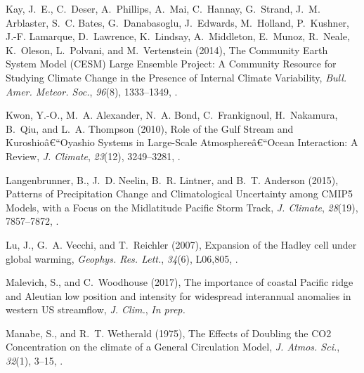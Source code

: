 \documentclass[final, double]{ua-thesis}
\begin{document}
\begin{thebibliography}{}
Kay, J.~E., C.~Deser, A.~Phillips, A.~Mai, C.~Hannay, G.~Strand, J.~M.
  Arblaster, S.~C. Bates, G.~Danabasoglu, J.~Edwards, M.~Holland, P.~Kushner,
  J.-F. Lamarque, D.~Lawrence, K.~Lindsay, A.~Middleton, E.~Munoz, R.~Neale,
  K.~Oleson, L.~Polvani, and M.~Vertenstein (2014), The {Community} {Earth}
  {System} {Model} ({CESM}) {Large} {Ensemble} {Project}: {A} {Community}
  {Resource} for {Studying} {Climate} {Change} in the {Presence} of {Internal}
  {Climate} {Variability}, \textit{Bull. Amer. Meteor. Soc.}, \textit{96}(8),
  1333--1349, .

Kwon, Y.-O., M.~A. Alexander, N.~A. Bond, C.~Frankignoul, H.~Nakamura, B.~Qiu,
  and L.~A. Thompson (2010), Role of the {Gulf} {Stream} and
  {Kuroshio}â€“{Oyashio} {Systems} in {Large}-{Scale} {Atmosphere}â€“{Ocean}
  {Interaction}: {A} {Review}, \textit{J. Climate}, \textit{23}(12),
  3249--3281, .

Langenbrunner, B., J.~D. Neelin, B.~R. Lintner, and B.~T. Anderson (2015),
  Patterns of {Precipitation} {Change} and {Climatological} {Uncertainty} among
  {CMIP}5 {Models}, with a {Focus} on the {Midlatitude} {Pacific} {Storm}
  {Track}, \textit{J. Climate}, \textit{28}(19), 7857--7872,
  .

Lu, J., G.~A. Vecchi, and T.~Reichler (2007), Expansion of the {Hadley} cell
  under global warming, \textit{Geophys. Res. Lett.}, \textit{34}(6), L06,805,
  .

Malevich, S., and C.~Woodhouse (2017), The importance of coastal {Pacific}
  ridge and {Aleutian} low position and intensity for widespread interannual
  anomalies in western {US} streamflow, \textit{J. Clim.}, \textit{In prep.}

Manabe, S., and R.~T. Wetherald (1975), The {Effects} of {Doubling} the {CO}2
  {Concentration} on the climate of a {General} {Circulation} {Model},
  \textit{J. Atmos. Sci.}, \textit{32}(1), 3--15,
  .


\end{thebibliography}
\end{document}
